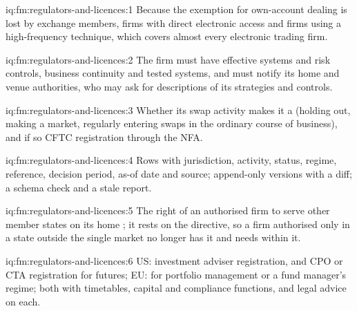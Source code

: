 \begin{solution}{iq:fm:regulators-and-licences:1}
Because the exemption for own-account dealing is lost by exchange members, firms with direct electronic access and firms using a high-frequency
technique, which covers almost every electronic trading firm.
\end{solution}

\begin{solution}{iq:fm:regulators-and-licences:2}
The firm must have effective systems and risk controls, business continuity and tested systems, and must notify its home and venue authorities,
who may ask for descriptions of its strategies and controls.
\end{solution}

\begin{solution}{iq:fm:regulators-and-licences:3}
Whether its swap activity makes it a  (holding out, making a market, regularly entering swaps in the ordinary course of business), and
if so CFTC registration through the NFA.
\end{solution}

\begin{solution}{iq:fm:regulators-and-licences:4}
Rows with jurisdiction, activity, status, regime, reference, decision period, as-of date and source; append-only versions with a diff; a schema
check and a stale report.
\end{solution}

\begin{solution}{iq:fm:regulators-and-licences:5}
The right of an authorised firm to serve other member states on its home ; it rests on the directive, so a firm authorised only in a
state outside the single market no longer has it and needs  within it.
\end{solution}

\begin{solution}{iq:fm:regulators-and-licences:6}
US: investment adviser registration, and CPO or CTA registration for futures; EU:  for portfolio management or a fund manager's
regime; both with timetables, capital and compliance functions, and legal advice on each.
\end{solution}
